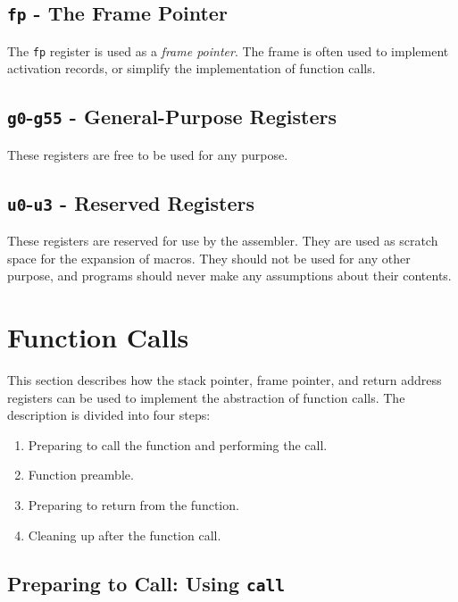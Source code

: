 \subsection{{\tt fp} - The Frame Pointer}

The {\tt fp} register is used as a {\em frame pointer}.  The frame is
often used to implement activation records, or simplify the
implementation of function calls.

\subsection{{\tt g0}-{\tt g55} - General-Purpose Registers}

These registers are free to be used for any purpose.

\subsection{{\tt u0}-{\tt u3} - Reserved Registers}

These registers are reserved for use by the assembler.  They are used
as scratch space for the expansion of macros.  They should not be used
for any other purpose, and programs should never make any assumptions
about their contents.

\section{Function Calls}

This section describes how the stack pointer, frame pointer, and
return address registers can be used to implement the abstraction of
function calls.  The description is divided into four steps:

\begin{enumerate}

\item	Preparing to call the function and performing the call.

\item	Function preamble.

\item	Preparing to return from the function.

\item	Cleaning up after the function call.

\end{enumerate}

\subsection{Preparing to Call: Using {\tt call}}
\label{reg32-call-sec}

